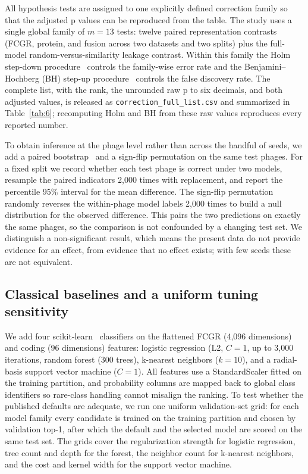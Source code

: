 \documentclass[utf8]{FrontiersinVancouver}
\begin{document}
All hypothesis tests are assigned to one explicitly defined correction family so that the adjusted p values can be reproduced from the table. The study uses a single global family of $m=13$ tests: twelve paired representation contrasts (FCGR, protein, and fusion across two datasets and two splits) plus the full-model random-versus-similarity leakage contrast. Within this family the Holm step-down procedure~\citep{holm1979simple} controls the family-wise error rate and the Benjamini--Hochberg (BH) step-up procedure~\citep{benjamini1995controlling} controls the false discovery rate. The complete list, with the rank, the unrounded raw p to six decimals, and both adjusted values, is released as \texttt{correction\_full\_list.csv} and summarized in Table~\ref{tab:6}; recomputing Holm and BH from these raw values reproduces every reported number.

To obtain inference at the phage level rather than across the handful of seeds, we add a paired bootstrap~\citep{efron1979bootstrap} and a sign-flip permutation on the same test phages. For a fixed split we record whether each test phage is correct under two models, resample the paired indicators 2,000 times with replacement, and report the percentile 95\% interval for the mean difference. The sign-flip permutation randomly reverses the within-phage model labels 2,000 times to build a null distribution for the observed difference. This pairs the two predictions on exactly the same phages, so the comparison is not confounded by a changing test set. We distinguish a non-significant result, which means the present data do not provide evidence for an effect, from evidence that no effect exists; with few seeds these are not equivalent.

\subsection{Classical baselines and a uniform tuning sensitivity}

We add four scikit-learn~\citep{pedregosa2011scikit} classifiers on the flattened FCGR (4,096 dimensions) and coding (96 dimensions) features: logistic regression (L2, $C=1$, up to 3,000 iterations, random forest (300 trees), k-nearest neighbors ($k=10$), and a radial-basis support vector machine ($C=1$). All features use a StandardScaler fitted on the training partition, and probability columns are mapped back to global class identifiers so rare-class handling cannot misalign the ranking. To test whether the published defaults are adequate, we run one uniform validation-set grid: for each model family every candidate is trained on the training partition and chosen by validation top-1, after which the default and the selected model are scored on the same test set. The grids cover the regularization strength for logistic regression, tree count and depth for the forest, the neighbor count for k-nearest neighbors, and the cost and kernel width for the support vector machine.
\end{document}
